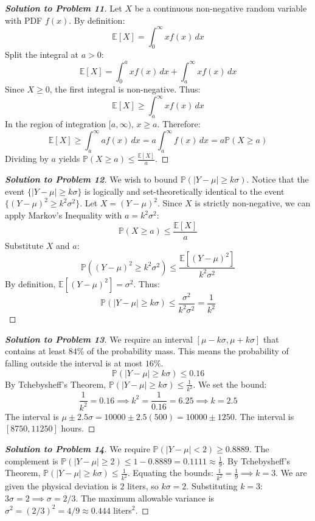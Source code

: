 \documentclass[11pt, a4paper]{article}
\theoremstyle{definition}
\theoremstyle{remark}
\newcommand{\E}{\mathbb{E}}
\newcommand{\Prob}{\mathbb{P}}
\begin{document}
\begin{proof}[\textbf{Solution to Problem 11}]
Let $X$ be a continuous non-negative random variable with PDF $f(x)$. By definition:
\[ \E[X] = \int_{0}^{\infty} x f(x) \, dx \]
Split the integral at $a > 0$:
\[ \E[X] = \int_{0}^{a} x f(x) \, dx + \int_{a}^{\infty} x f(x) \, dx \]
Since $X \ge 0$, the first integral is non-negative. Thus:
\[ \E[X] \ge \int_{a}^{\infty} x f(x) \, dx \]
In the region of integration $[a, \infty)$, $x \ge a$. Therefore:
\[ \E[X] \ge \int_{a}^{\infty} a f(x) \, dx = a \int_{a}^{\infty} f(x) \, dx = a \Prob(X \ge a) \]
Dividing by $a$ yields $\Prob(X \ge a) \le \frac{\E[X]}{a}$.
\end{proof}

\begin{proof}[\textbf{Solution to Problem 12}]
We wish to bound $\Prob(|Y - \mu| \ge k\sigma)$.
Notice that the event $\{|Y - \mu| \ge k\sigma\}$ is logically and set-theoretically identical to the event $\{(Y - \mu)^2 \ge k^2\sigma^2\}$.
Let $X = (Y - \mu)^2$. Since $X$ is strictly non-negative, we can apply Markov's Inequality with $a = k^2\sigma^2$:
\[ \Prob(X \ge a) \le \frac{\E[X]}{a} \]
Substitute $X$ and $a$:
\[ \Prob((Y - \mu)^2 \ge k^2\sigma^2) \le \frac{\E[(Y - \mu)^2]}{k^2\sigma^2} \]
By definition, $\E[(Y - \mu)^2] = \sigma^2$. Thus:
\[ \Prob(|Y - \mu| \ge k\sigma) \le \frac{\sigma^2}{k^2\sigma^2} = \frac{1}{k^2} \]
\end{proof}

\begin{proof}[\textbf{Solution to Problem 13}]
We require an interval $[\mu - k\sigma, \mu + k\sigma]$ that contains at least $84\%$ of the probability mass. This means the probability of falling outside the interval is at most $16\%$.
\[ \Prob(|Y - \mu| \ge k\sigma) \le 0.16 \]
By Tchebysheff's Theorem, $\Prob(|Y - \mu| \ge k\sigma) \le \frac{1}{k^2}$. We set the bound:
\[ \frac{1}{k^2} = 0.16 \implies k^2 = \frac{1}{0.16} = 6.25 \implies k = 2.5 \]
The interval is $\mu \pm 2.5\sigma = 10000 \pm 2.5(500) = 10000 \pm 1250$.
The interval is $[8750, 11250]$ hours.
\end{proof}

\begin{proof}[\textbf{Solution to Problem 14}]
We require $\Prob(|Y - \mu| < 2) \ge 0.8889$.
The complement is $\Prob(|Y - \mu| \ge 2) \le 1 - 0.8889 = 0.1111 \approx \frac{1}{9}$.
By Tchebysheff's Theorem, $\Prob(|Y - \mu| \ge k\sigma) \le \frac{1}{k^2}$.
Equating the bounds: $\frac{1}{k^2} = \frac{1}{9} \implies k = 3$.
We are given the physical deviation is $2$ liters, so $k\sigma = 2$.
Substituting $k=3$: $3\sigma = 2 \implies \sigma = 2/3$.
The maximum allowable variance is $\sigma^2 = (2/3)^2 = 4/9 \approx 0.444$ liters$^2$.
\end{proof}
\end{document}

